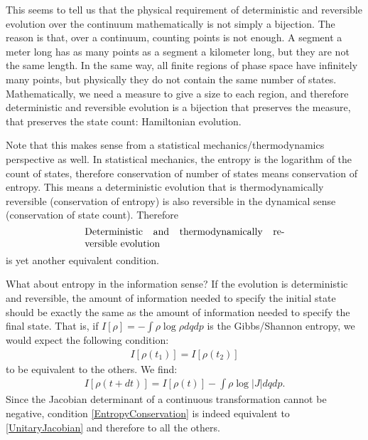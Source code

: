 \documentclass[10pt,twocolumn, nofootinbib]{revtex4-2}
\begin{document}
This seems to tell us that the physical requirement of deterministic and reversible evolution over the continuum mathematically is not simply a bijection. The reason is that, over a continuum, counting points is not enough. A segment a meter long has as many points as a segment a kilometer long, but they are not the same length. In the same way, all finite regions of phase space have infinitely many points, but physically they do not contain the same number of states. Mathematically, we need a measure to give a size to each region, and therefore deterministic and reversible evolution is a bijection that preserves the measure, that preserves the state count: Hamiltonian evolution.

Note that this makes sense from a statistical mechanics/thermodynamics perspective as well. In statistical mechanics, the entropy is the logarithm of the count of states, therefore conservation of number of states means conservation of entropy. This means a deterministic evolution that is thermodynamically reversible (conservation of entropy) is also reversible in the dynamical sense (conservation of state count). Therefore 
\begin{align}\label{DeterminismThermodynamicReversibility}
	\parbox{2.8in}{Deterministic and thermodynamically reversible evolution}
\end{align}
is yet another equivalent condition.

What about entropy in the information sense? If the evolution is deterministic and reversible, the amount of information needed to specify the initial state should be exactly the same as the amount of information needed to specify the final state. That is, if $I[\rho] = - \int \rho \log \rho dqdp$ is the Gibbs/Shannon entropy, we would expect the following condition:
\begin{align}\label{EntropyConservation}
	I[\rho(t_1)] = I[\rho(t_2)]
\end{align}
to be equivalent to the others. We find:
\begin{align}
	I[\rho(t + dt)] = I[\rho(t)] - \int \rho \log |J| dqdp.
\end{align}
Since the Jacobian determinant of a continuous transformation cannot be negative, condition \eqref{EntropyConservation} is indeed equivalent to \eqref{UnitaryJacobian} and therefore to all the others.
\end{document}
